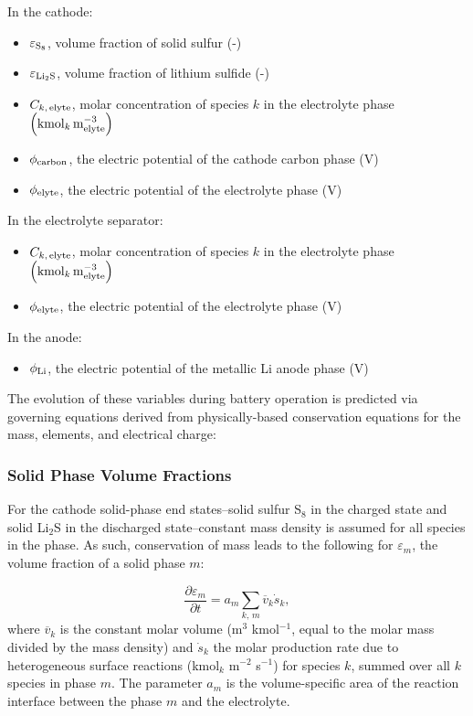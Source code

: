 \documentclass{elsarticle}
\begin{document}
In the cathode:
\begin{itemize}
    \item $\varepsilon_{\rm S_8}$, volume fraction of solid sulfur (-)
	\item $\varepsilon_{\rm Li_2S}$, volume fraction of lithium sulfide (-)
	\item $C_{k,\,{\rm elyte}}$, molar concentration of species $k$ in the electrolyte phase $\left({\rm kmol}_k\, {\rm m_{elyte}^{-3}}\right)$
	\item $\phi_{\rm carbon}$, the electric potential of the cathode carbon phase (V)
	\item $\phi_{\rm elyte}$, the electric potential of the electrolyte phase (V)
\end{itemize}

In the electrolyte separator:
\begin{itemize}
    \item $C_{k,\,{\rm elyte}}$, molar concentration of species $k$ in the electrolyte phase $\left({\rm kmol}_k\, {\rm m_{elyte}^{-3}}\right)$
    \item $\phi_{\rm elyte}$, the electric potential of the electrolyte phase (V)
\end{itemize}

In the anode:
\begin{itemize}
    \item $\phi_{\rm Li}$, the electric potential of the metallic Li anode phase (V)
\end{itemize}

The evolution of these variables during battery operation is predicted via governing equations derived from physically-based conservation equations for the mass, elements, and electrical charge:

\subsubsection{Solid Phase Volume Fractions}
For the cathode solid-phase end states--solid sulfur S$_8$ in the charged state and solid Li$_2$S in the discharged state--constant mass density is assumed for all species in the phase. As such, conservation of mass leads to the following for $\varepsilon_m$, the volume fraction of a solid phase $m$: 

\begin{equation}\label{eq:dEps_dt}
    \frac{\partial \varepsilon_m}{\partial t} = a_m\sum_{k,\,m} \overline{v}_k\dot{s}_k,
\end{equation}
where $\overline{v}_k$ is the constant molar volume (m$^3$ kmol$^{-1}$, equal to the molar mass divided by the mass density) and $\dot{s}_k$ the molar production rate due to heterogeneous surface reactions (kmol$_k$ m$^{-2}$ s$^{-1}$) for species $k$, summed over all $k$ species in phase $m$.  The parameter $a_m$ is the volume-specific area of the reaction interface between the phase $m$ and the electrolyte.
\end{document}
